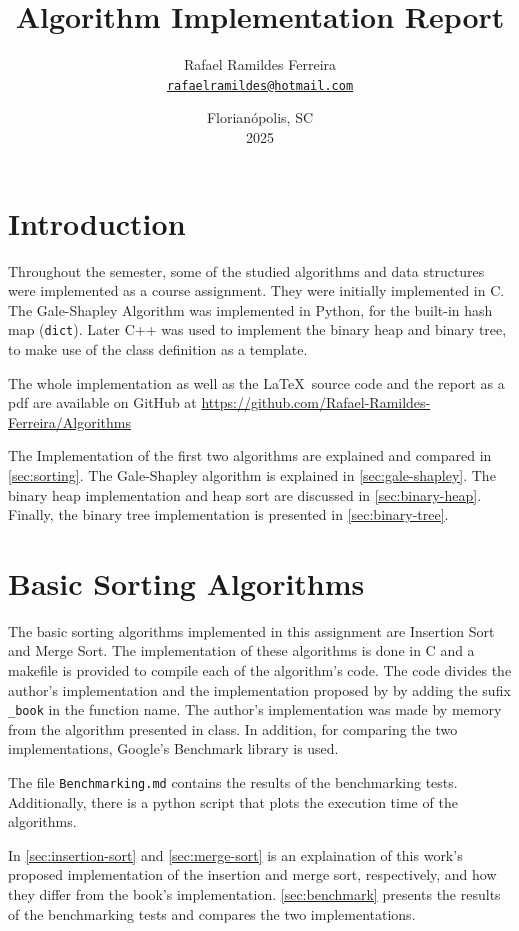 \documentclass[a4paper,12pt,twocolumn]{article}
\title{Algorithm Implementation Report}
\author{Rafael Ramildes Ferreira \\ \href{mailto:rafaelramildes@hotmail.com}{\texttt{rafaelramildes@hotmail.com}}}
\date{Florianópolis, SC \\ 2025}
\begin{document}
\maketitle

\section*{Introduction}

Throughout the semester, some of the studied algorithms and data structures were implemented as a course assignment. They were initially implemented in C. The Gale-Shapley Algorithm was implemented in Python, for the built-in hash map (\texttt{dict}). Later C++ was used to implement the binary heap and binary tree, to make use of the class definition as a template.

The whole implementation as well as the \LaTeX\ source code and the report as a pdf are available on GitHub at \url{https://github.com/Rafael-Ramildes-Ferreira/Algorithms}

The Implementation of the first two algorithms are explained and compared in \autoref{sec:sorting}. The Gale-Shapley algorithm is explained in \autoref{sec:gale-shapley}. The binary heap implementation and heap sort are discussed in \autoref{sec:binary-heap}. Finally, the binary tree implementation is presented in \autoref{sec:binary-tree}.

\section{Basic Sorting Algorithms}
\label{sec:sorting}

The basic sorting algorithms implemented in this assignment are Insertion Sort and Merge Sort. The implementation of these algorithms is done in C and a makefile is provided to compile each of the algorithm's code.
The code divides the author's implementation and the implementation proposed by \cite{cormenIntroductionAlgorithms2022} by adding the sufix \verb|_book| in the function name.
The author's implementation was made by memory from the algorithm presented in class.
In addition, for comparing the two implementations, Google's Benchmark library is used.

The file \verb|Benchmarking.md| contains the results of the benchmarking tests.
Additionally, there is a python script that plots the execution time of the algorithms.

In \autoref{sec:insertion-sort} and \autoref{sec:merge-sort} is an explaination of this work's proposed implementation of the insertion and merge sort, respectively, and how they differ from the book's implementation. \autoref{sec:benchmark} presents the results of the benchmarking tests and compares the two implementations.
\end{document}
